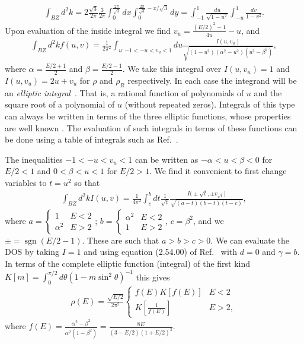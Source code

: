 \documentclass[aps,pra,preprint,groupedaddress]{revtex4-1}
\DeclareMathOperator{\sgn}{sgn}
\newcommand{\1}{\mathds{1}}
\begin{document}
\begin{align}
\int_{BZ}d^2 k = 2 \frac{\sqrt{3}}{2\pi} \frac{3}{2\pi} \int_0^\frac{2\pi}{\sqrt{3}} dx \int_0^{{\frac{2\pi}{\sqrt{3}}-x}/\sqrt{3}} dy =  \int_{-1}^1 \frac{du}{\sqrt{1-u^2}} \int_{-u}^1 \frac{dv}{1-v^2}.
\end{align}
Upon evaluation of the inside integral we find $v_u = \frac{(E/2)^2-1}{4u}-u$, and
\begin{align*}
\int_{BZ}d^2 k f(u,v) = \frac{1}{2 \pi^2} \int_{u:-1<-u<v_u<1} du  \frac{I(u,v_u)}{\sqrt{(1-u^2)(\alpha^2 - u^2)(u^2 - \beta^2)}}, 
\end{align*}
where $\alpha=\frac{E/2+1}{2}$ and $\beta = \frac{E/2-1}{2}$. We take this integral over $I(u,v_u)=1$ and $I(u,v_u)=2u+v_u$ for $\rho$ and $\rho_R$ respectively. In each case the integrand will be an \emph{elliptic integral}~\cite{Byrd}. That is, a rational function of polynomials of $u$ and the square root of a polynomial of $u$ (without repeated zeros). Integrals of this type can always be written in terms of the three elliptic functions, whose properties are well known \cite{Byrd}. The evaluation of such integrals in terms of these functions can be done using a table of integrals such as Ref.~. 

The inequalities $-1<-u<v_u<1$ can be written as $-\alpha < u < \beta < 0$ for $E/2<1$ and $0< \beta < u < 1$ for $E/2 > 1$. We find it convenient to first change variables to $t=u^2$ so that
\begin{align}
\int_{BZ} d^2 k I(u,v) = \frac{1}{4 \pi^2} \int_c^b dt \frac{1}{\sqrt{t}} \frac{I\Big(\pm\sqrt{t},\pm v_{\sqrt{t}}\Big)}{\sqrt{(a-t)(b - t)(t - c)}}, 
\end{align}
where $a = \left\{\begin{array}{lc}1 & E<2 \\ \alpha^2 & E>2\end{array}\right.$; $b=\left\{\begin{array}{lc}\alpha^2 & E<2 \\ 1 & E>2 \end{array}\right.$, $c = \beta^2$, and we $\pm = \sgn (E/2 -1)$. These are such that $a>b>c>0$. We can evaluate the DOS by taking $I=1$ and using equation (2.54.00) of Ref.~ with $d=0$ and $\gamma=b$. In terms of the complete elliptic function (integral) of the first kind $K[m] = \int_0^{\pi/2} d\theta (1-m\sin^2 \theta)^{-1}$ this gives
\begin{align}
\rho(E) = \frac{\sqrt{E/2}}{2 \pi^2} \left\{ \begin{array}{cc}
f(E) K[f(E)] & E<2\\
K[\frac{1}{f(E)}] & E>2,
\end{array} \right.
\end{align}
where $f(E) = \frac{\alpha^2 - \beta^2}{\alpha^2(1-\beta^2)} = \frac{8 E}{(3-E/2)(1+E/2)^3}$.
\end{document}
